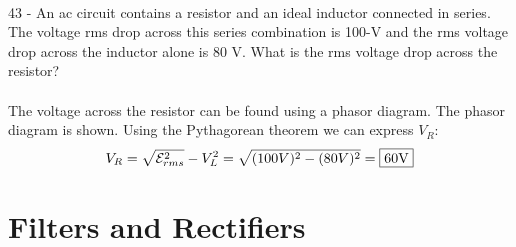 \documentclass{report}
\begin{document}
\paragraph{}
43 - An ac circuit contains a resistor and an ideal inductor connected in series. The voltage rms drop across this series combination is 100-V and the rms voltage drop across the inductor alone is 80 V. What is the rms voltage drop across the resistor?\\
\\
The voltage across the resistor can be found using a phasor diagram. The phasor diagram is shown. Using the Pythagorean theorem we can express $V_R$:
$$V_R = \sqrt{\mathcal{E}_{rms}^2} - V_L^2 = \sqrt{(100V)^2 - (80V)^2} = \fbox{60V}$$

\section{Filters and Rectifiers}
\end{document}

